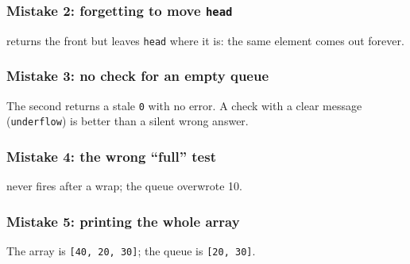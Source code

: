 \documentclass[aspectratio=169,10pt,compress]{beamer}
\begin{document}
\begin{frame}[t,fragile] \frametitle{Mistake 2: forgetting to move \texttt{head}}

  \vspace{0.2em}
  \small {} returns the front but leaves \texttt{head} where it is: the same element comes out forever.
\end{frame}




\begin{frame}[t,fragile] \frametitle{Mistake 3: no check for an empty queue}

  \vspace{0.2em}
  \small The second  returns a stale \texttt{0} with no error. A check with a clear message (\texttt{underflow}) is better than a silent wrong answer.
\end{frame}




\begin{frame}[t,fragile] \frametitle{Mistake 4: the wrong ``full'' test}

  \vspace{0.1em}
  \small {} never fires after a wrap; the queue overwrote 10.
\end{frame}




\begin{frame}[t,fragile] \frametitle{Mistake 5: printing the whole array}

  \vspace{0.1em}
  \small The array is \texttt{[40, 20, 30]}; the queue is \texttt{[20, 30]}.
\end{frame}
\end{document}
